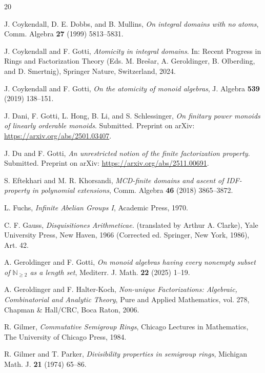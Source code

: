 \documentclass[10pt]{amsart}
\theoremstyle{definition}
\theoremstyle{remark}
\numberwithin{equation}{section}
\begin{document}
\begin{thebibliography}{20}

 J. Coykendall, D. E. Dobbs, and B. Mullins, \emph{On integral domains with no atoms}, Comm. Algebra \textbf{27} (1999) 5813--5831.

 J. Coykendall and F. Gotti, \emph{Atomicity in integral domains}. In: Recent Progress in Rings and Factorization Theory (Eds. M. Brešar, A. Geroldinger, B. Olberding, and D. Smertnig), Springer Nature, Switzerland, 2024.

 J. Coykendall and F. Gotti, \emph{On the atomicity of monoid algebras}, J. Algebra \textbf{539} (2019) 138--151.

 J. Dani, F. Gotti, L. Hong, B. Li, and S. Schlessinger, \emph{On finitary power monoids of linearly orderable monoids}. Submitted. Preprint on arXiv: \url{https://arxiv.org/abs/2501.03407}.

 J. Du and F. Gotti, \emph{An unrestricted notion of the finite factorization property}. Submitted. Preprint on arXiv: \url{https://arxiv.org/abs/2511.00691}.

 S. Eftekhari and M. R. Khorsandi, \emph{MCD-finite domains and ascent of IDF-property in polynomial extensions}, Comm. Algebra \textbf{46} (2018) 3865--3872.

 L. Fuchs, \emph{Infinite Abelian Groups I}, Academic Press, 1970.

 C. F. Gauss, \emph{Disquisitiones Arithmeticae.} (translated by Arthur A. Clarke), Yale University Press, New Haven, 1966 (Corrected ed. Springer, New York, 1986), Art. 42.

 A. Geroldinger and F. Gotti, \emph{On monoid algebras having every nonempty subset of $\mathbb{N}_{\ge 2}$ as a length set}, Mediterr. J. Math. \textbf{22} (2025) 1--19.

 A. Geroldinger and F. Halter-Koch, \emph{Non-unique Factorizations: Algebraic, Combinatorial and Analytic Theory}, Pure and Applied Mathematics, vol. 278, Chapman \& Hall/CRC, Boca Raton, 2006.

 R. Gilmer, \emph{Commutative Semigroup Rings}, Chicago Lectures in Mathematics, The University of Chicago Press, 1984.

 R. Gilmer and T. Parker, \emph{Divisibility properties in semigroup rings}, Michigan Math. J. \textbf{21} (1974) 65--86.


\end{thebibliography}
\end{document}
